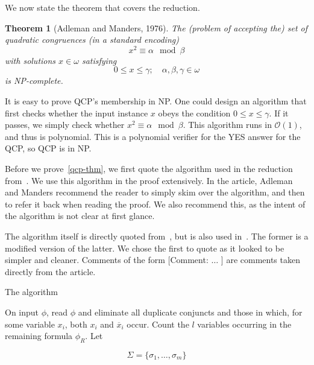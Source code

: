 \documentclass{amsart}
\makeatletter
\def\subsection{\@startsection{subsection}{3}%
  \z@{.5\linespacing\@plus.7\linespacing}{.1\linespacing}%
  {\normalfont}}
\newcommand{\ov}{\overline}
\theoremstyle{plain}
\newtheorem{theorem}{Theorem}
\newcommand{\bigo}{\mathcal{O}}
\makeatother
\begin{document}
We now state the theorem that covers the reduction.

\begin{theorem}[Adleman and Manders, 1976]\label{qcp-thm}
  The (problem of accepting the) set of quadratic congruences (in a standard encoding)
  \begin{equation*}
    x^2\equiv\alpha\mod\beta
  \end{equation*}
  with solutions $x\in\omega$ satisfying
  \begin{equation*}
    0\leq x\leq\gamma;\quad \alpha,\beta,\gamma\in\omega
  \end{equation*}
  is NP-complete.
\end{theorem}

It is easy to prove QCP's membership in NP\@. One could design an algorithm that first checks
whether the input instance $x$ obeys the condition $0\leq x\leq\gamma$. If it passes, we simply
check whether $x^2\equiv\alpha\mod\beta$. This algorithm runs in $\bigo(1)$, and thus is
polynomial. This is a polynomial verifier for the YES answer for the QCP, so QCP is in NP\@.

Before we prove~\autoref{qcp-thm}, we first quote the algorithm used in the reduction
from~\cite{qcp2}. We use this algorithm in the proof extensively. In the article, Adleman and
Manders recommend the reader to simply skim over the algorithm, and then to refer it back when
reading the proof. We also recommend this, as the intent of the algorithm is not clear at first
glance.

The algorithm itself is directly quoted from~\cite{qcp2}, but is also used in~\cite{qcp1}. The
former is a modified version of the latter. We chose the first to quote as it looked to be simpler
and cleaner. Comments of the form [Comment: $\ldots$ ] are comments taken directly from the
article.

\subsection{The algorithm}

On input $\phi$, read $\phi$ and eliminate all duplicate conjuncts and those in which, for some
variable $x_i$, both $x_i$ and $\ov{x}_i$ occur. Count the $l$ variables occurring in the remaining
formula $\phi_R$. Let

\begin{equation*}
  \Sigma = \{\sigma_1,\ldots,\sigma_m\}
\end{equation*}
\end{document}
